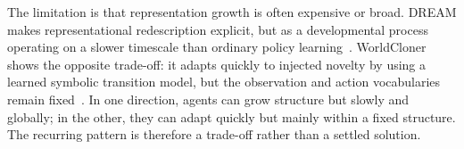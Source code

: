 The limitation is that representation growth is often expensive or broad.
DREAM makes representational redescription explicit, but as a developmental process operating on a slower timescale than ordinary policy learning~\citep{doncieux2020dream}.
WorldCloner shows the opposite trade-off: it adapts quickly to injected novelty by using a learned symbolic transition model, but the observation and action vocabularies remain fixed~\citep{balloch2023neuro}.
In one direction, agents can grow structure but slowly and globally; in the other, they can adapt quickly but mainly within a fixed structure.
The recurring pattern is therefore a trade-off rather than a settled solution.

